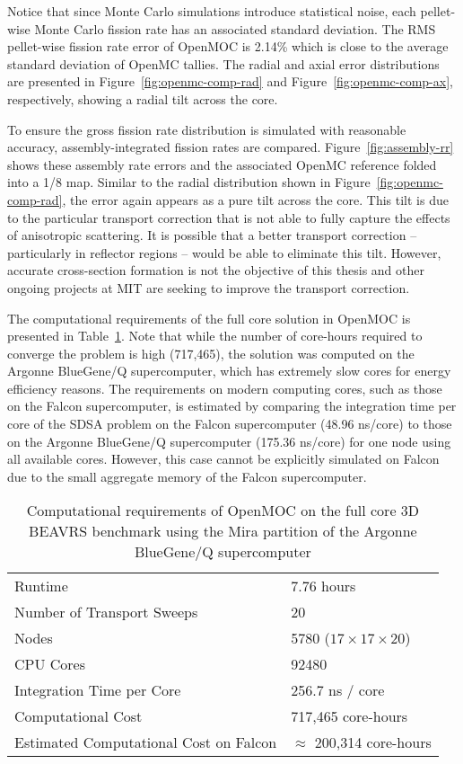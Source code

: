 \documentclass[12pt,twoside]{mitthesis-exec}
\begin{document}
Notice that since Monte Carlo simulations introduce statistical noise, each pellet-wise Monte Carlo fission rate has an associated standard deviation. The RMS pellet-wise fission rate error of OpenMOC is 2.14\% which is close to the average standard deviation of OpenMC tallies. The radial and axial error distributions are presented in Figure~\ref{fig:openmc-comp-rad} and Figure~\ref{fig:openmc-comp-ax}, respectively, showing a radial tilt across the core.

To ensure the gross fission rate distribution is simulated with reasonable accuracy, assembly-integrated fission rates are compared. Figure~\ref{fig:assembly-rr} shows these assembly rate errors and the associated OpenMC reference folded into a 1/8 map. Similar to the radial distribution shown in Figure~\ref{fig:openmc-comp-rad}, the error again appears as a pure tilt across the core. This tilt is due to the particular transport correction that is not able to fully capture the effects of anisotropic scattering. It is possible that a better transport correction -- particularly in reflector regions -- would be able to eliminate this tilt. However, accurate cross-section formation is not the objective of this thesis and other ongoing projects at MIT are seeking to improve the transport correction.

The computational requirements of the full core solution in OpenMOC is presented in Table~\ref{tab:full-core-comp-req}. Note that while the number of core-hours required to converge the problem is high (717,465), the solution was computed on the Argonne BlueGene/Q supercomputer, which has extremely slow cores for energy efficiency reasons. The requirements on modern computing cores, such as those on the Falcon supercomputer, is estimated by comparing the integration time per core of the SDSA problem on the Falcon supercomputer (48.96 ns/core) to those on the Argonne BlueGene/Q supercomputer (175.36 ns/core) for one node using all available cores. However, this case cannot be explicitly simulated on Falcon due to the small aggregate memory of the Falcon supercomputer.

\begin{table}[ht]
	\centering
	\caption{Computational requirements of OpenMOC on the full core 3D BEAVRS benchmark using the Mira partition of the Argonne BlueGene/Q supercomputer}
	\medskip
	\begin{tabular}{l|l}
		\hline
		Runtime & 7.76 hours \\
		Number of Transport Sweeps & 20 \\
		Nodes & 5780 ($17 \times 17 \times 20$) \\
		CPU Cores & 92480 \\
		Integration Time per Core & 256.7 ns / core \\
		Computational Cost & 717,465 core-hours \\
		Estimated Computational Cost on Falcon & $\approx$ 200,314 core-hours \\
		\hline
	\end{tabular}
	\label{tab:full-core-comp-req}
\end{table}
\end{document}
